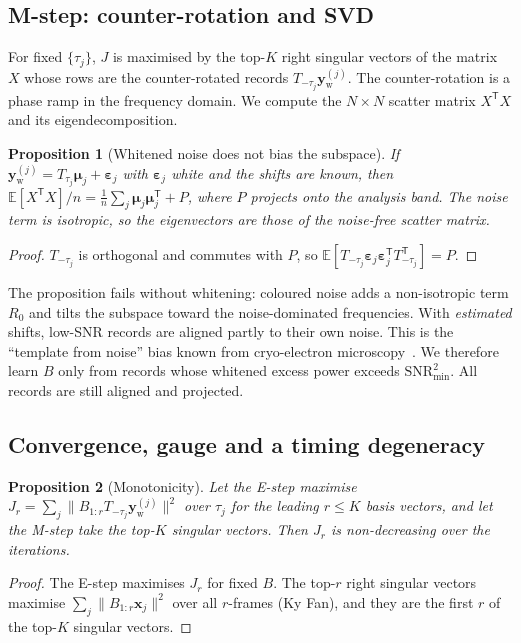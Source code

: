 \documentclass[aps,prapplied,reprint,superscriptaddress,longbibliography,nofootinbib]{revtex4-2}
\newtheorem{proposition}{Proposition}
\theoremstyle{remark}
\newcommand{\T}{\mathsf{T}}
\newcommand{\E}{\mathbb{E}}
\newcommand{\vect}[1]{\bm{#1}}
\newcommand{\Sh}[1]{T_{#1}}
\newcommand{\yw}{\vect{y}_{\mathrm w}}
\begin{document}
\subsection{M-step: counter-rotation and SVD}
For fixed $\{\tau_j\}$, $J$ is maximised by the top-$K$ right singular vectors of the
matrix $X$ whose rows are the counter-rotated records $\Sh{-\tau_j}\yw^{(j)}$. The
counter-rotation is a phase ramp in the frequency domain. We compute the $N\times N$
scatter matrix $X^\T X$ and its eigendecomposition.

\begin{proposition}[Whitened noise does not bias the subspace]\label{prop:unbiased}
If $\yw^{(j)}=\Sh{\tau_j}\vect\mu_j+\vect\varepsilon_j$ with $\vect\varepsilon_j$
white and the shifts are known, then
$\E[X^\T X]/n=\frac1n\sum_j\vect\mu_j\vect\mu_j^\T+P$, where $P$ projects onto the
analysis band. The noise term is isotropic, so the eigenvectors are those of the
noise-free scatter matrix.
\end{proposition}
\begin{proof}
$\Sh{-\tau_j}$ is orthogonal and commutes with $P$, so
$\E[\Sh{-\tau_j}\vect\varepsilon_j\vect\varepsilon_j^\T\Sh{-\tau_j}^\T]=P$.
\end{proof}
The proposition fails without whitening: coloured noise adds a non-isotropic term
$R_0$ and tilts the subspace toward the noise-dominated frequencies. With
\emph{estimated} shifts, low-SNR records are aligned partly to their own noise. This
is the ``template from noise'' bias known from cryo-electron
microscopy~\cite{Sigworth1998,Henderson2013}. We therefore learn $B$ only from
records whose whitened excess power exceeds $\mathrm{SNR}_{\min}^2$. All records
are still aligned and projected.

\subsection{Convergence, gauge and a timing degeneracy}

\begin{proposition}[Monotonicity]\label{prop:monotone}
Let the E-step maximise
$J_r=\sum_j\|B_{1:r}\Sh{-\tau_j}\yw^{(j)}\|^2$ over $\tau_j$ for the leading
$r\le K$ basis vectors, and let the M-step take the top-$K$ singular vectors. Then
$J_r$ is non-decreasing over the iterations.
\end{proposition}
\begin{proof}
The E-step maximises $J_r$ for fixed $B$. The top-$r$ right singular vectors
maximise $\sum_j\|B_{1:r}\vect x_j\|^2$ over all $r$-frames (Ky Fan), and they are
the first $r$ of the top-$K$ singular vectors.
\end{proof}
\end{document}
